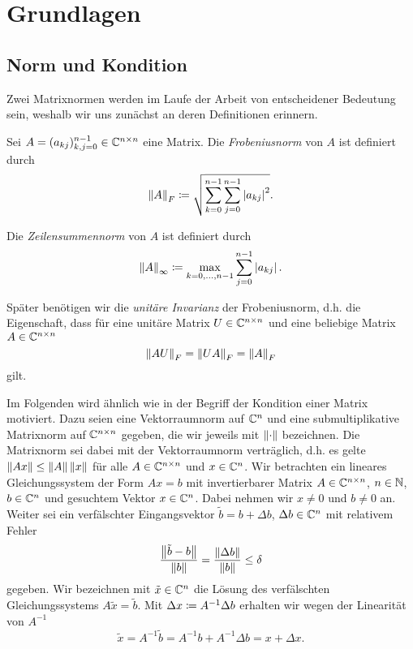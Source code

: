 \chapter{Grundlagen}
\section{Norm und Kondition}
Zwei Matrixnormen werden im Laufe der Arbeit von entscheidener Bedeutung sein,
weshalb wir uns zunächst an deren Definitionen erinnern.

\begin{mydef}
    Sei $A = (a_{kj})_{k,j=0}^{n-1} \in \mathbb{C}^{n\times n}$ eine Matrix.
    Die \emph{Frobeniusnorm} von $A$ ist definiert durch
    \begin{equation}
        \label{eq:frobenius_norm}
        \left\lVert A \right\rVert_F
        \coloneqq \sqrt{ \sum_{k=0}^{n-1} \sum_{j=0}^{n-1} \left\lvert a_{kj} \right\rvert^2}.
    \end{equation}

    \noindent Die \emph{Zeilensummennorm} von $A$ ist definiert durch
    \begin{equation}
        \label{eq:infinity_norm}
        \left\lVert A \right\rVert_\infty
        \coloneqq \max_{k=0, \dots, n-1} \sum_{j=0}^{n-1} \left\lvert a_{kj} \right\rvert.
    \end{equation}
\end{mydef}

\begin{remark}
    Später benötigen wir die \emph{unitäre Invarianz} der
    Frobeniusnorm, d.h. die Eigenschaft, dass für eine unitäre Matrix
    $U \in \mathbb{C}^{n\times n}$ und eine beliebige Matrix ${A \in \mathbb{C}^{n\times n}}$
    \[
        \left\lVert A U \right\rVert_F = \left\lVert U A \right\rVert_F = \left\lVert A \right\rVert_F
    \]
    gilt.
\end{remark}

Im Folgenden wird ähnlich wie in \cite[S. 205ff]{stoer1} der Begriff der Kondition
einer Matrix motiviert.  Dazu seien eine Vektorraumnorm auf $\mathbb{C}^n$ und eine
submultiplikative Matrixnorm auf $\mathbb{C}^{n\times n}$ gegeben, die wir jeweils mit
$\left\lVert \cdot \right\rVert$ bezeichnen. Die Matrixnorm sei dabei mit der Vektorraumnorm
verträglich, d.h. es gelte $ \left\lVert Ax \right\rVert \leq \left\lVert A \right\rVert\left\lVert x \right\rVert$ für alle $A \in
\mathbb{C}^{n\times n}$ und $x \in \mathbb{C}^n$.
Wir betrachten ein lineares Gleichungssystem der Form
$Ax = b$ mit invertierbarer Matrix
$A \in \mathbb{C}^{n \times n}$, $n \in \mathbb{N}$, $b \in \mathbb{C}^n$
und gesuchtem Vektor $x \in \mathbb{C}^n$.
Dabei nehmen wir $x \neq 0$ und $b \neq 0$ an.
Weiter sei ein verfälschter Eingangsvektor $\tilde{b} = b + \Delta b$,
$\Delta b \in \mathbb{C}^n$ mit relativem Fehler
\[
    \frac{\left\lVert \tilde{b} - b \right\rVert}{\left\lVert b \right\rVert} = \frac{\left\lVert \Delta b \right\rVert}{\left\lVert b \right\rVert} \leq \delta
\]
gegeben.
Wir bezeichnen mit $\tilde{x} \in \mathbb{C}^n$ die Lösung des verfälschten Gleichungssystems
$A \tilde{x} = \tilde{b}$.
Mit $\Delta x \coloneqq A^{-1} \Delta b$ erhalten wir wegen der Linearität von $A^{-1}$
\[
    \tilde{x} = A^{-1} \tilde{b} = A^{-1} b + A^{-1} \Delta b = x + \Delta x.
\]

